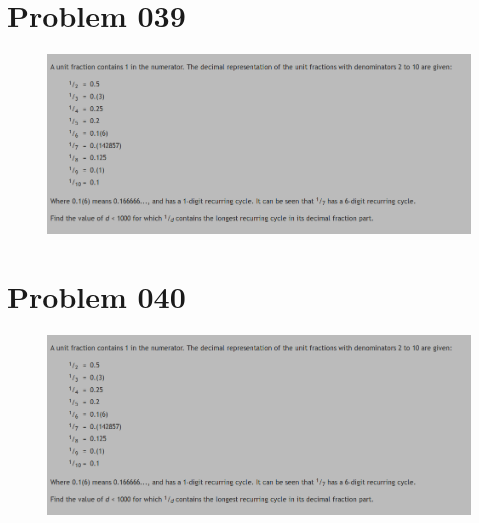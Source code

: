 \section{Problem 039}
\begin{prob}
	\begin{figure}[htb!]
		\begin{center}
			\includegraphics[scale = 0.4]{pic/026.png}
		\end{center}
	\end{figure}
\end{prob}
\section{Problem 040}
\begin{prob}
	\begin{figure}[htb!]
		\begin{center}
			\includegraphics[scale = 0.4]{pic/026.png}
		\end{center}
	\end{figure}
\end{prob}